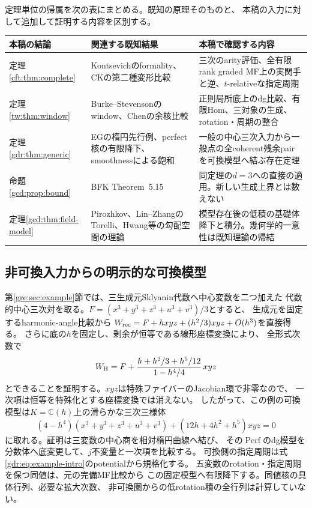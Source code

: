 \smallskip
定理単位の帰属を次の表にまとめる。既知の原理そのものと、
本稿の入力に対して追加して証明する内容を区別する。
\begin{longtable}{@{}p{.23\linewidth}p{.34\linewidth}p{.37\linewidth}@{}}
\toprule
本稿の結論 & 関連する既知結果 & 本稿で確認する内容\\
\midrule
\endhead
定理\ref{cft:thm:complete} & Kontsevichのformality、CKの第二種変形比較
& 三次のarity評価、全有限rank graded MF上の実関手と逆、$t$-relativeな指定周期\\
定理\ref{tw:thm:window} & Burke--Stevensonのwindow、Chenの余核比較
& 正則局所底上のdg比較、有限Hom、三対象の生成、rotation・周期の整合\\
定理\ref{gdr:thm:generic} & EGの楕円先行例、perfect核の有限降下、smoothnessによる飽和
& 一般の中心三次入力から一般点の全coherent残余pairを可換模型へ結ぶ存在定理\\
命題\ref{gcd:prop:bound} & BFK Theorem~5.15
& 同定理の$d=3$への直接の適用。新しい生成上界とは数えない\\
定理\ref{gcd:thm:field-model} & Pirozhkov、Lin--ZhangのTorelli、Hwang等の勾配空間の理論
& 模型存在後の低積の基礎体降下と積分。幾何学的一意性は既知理論の帰結\\
\bottomrule
\end{longtable}

\subsection{非可換入力からの明示的な可換模型}
第\ref{gre:sec:example}節では、三生成元Sklyanin代数へ中心変数を二つ加えた
代数的中心三次対を取る。$F=(x^3+y^3+z^3+u^3+v^3)/3$とすると、
生成元を固定するharmonic-angle比較から
$W_{\rm rec}=F+hxyz+(h^2/3)xyz+O(h^3)$を直接得る。
さらに底の$h$を固定し、剰余が恒等である線形座標変換により、
全形式次数で
\begin{equation}\label{gdr:eq:example-intro}
 W_{\rm H}=F+\frac{h+h^2/3+h^5/12}{1-h^4/4}\,xyz
\end{equation}
とできることを証明する。$xyz$は特殊ファイバーのJacobian環で非零なので、
一次項は恒等を特殊化とする座標変換では消えない。
したがって、この例の可換模型は$K=\mathbb C(h)$上の滑らかな三次三様体
\begin{equation}\label{gdr:eq:explicit-model-intro}
 (4-h^4)(x^3+y^3+z^3+u^3+v^3)
 +(12h+4h^2+h^5)xyz=0
\end{equation}
に取れる。証明は三変数の中心商を相対楕円曲線へ結び、
その$\operatorname{Perf}$のdg模型を分数体へ底変更して、$j$不変量と一次項を比較する。
可換側の指定周期は式\eqref{gdr:eq:example-intro}のpotentialから規格化する。
五変数のrotation・指定周期を保つ同値は、元の完備MF比較から
この固定模型へ有限降下する。同値核の具体行列、必要な拡大次数、
非可換圏からの低rotation積の全行列は計算していない。

